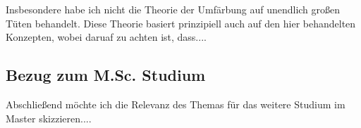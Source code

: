 \documentclass[11pt]{scrartcl}
\theoremstyle{plain}
\theoremstyle{definition}
\theoremstyle{remark}
\begin{document}
Insbesondere habe ich nicht die Theorie der Umfärbung auf unendlich
großen Tüten behandelt.  Diese Theorie basiert prinzipiell auch auf
den hier behandelten Konzepten, wobei daruaf zu achten ist, dass....



\subsection{Bezug zum M.Sc. Studium}
Abschließend möchte ich die Relevanz des Themas für das weitere
Studium im Master skizzieren....







\end{document}
